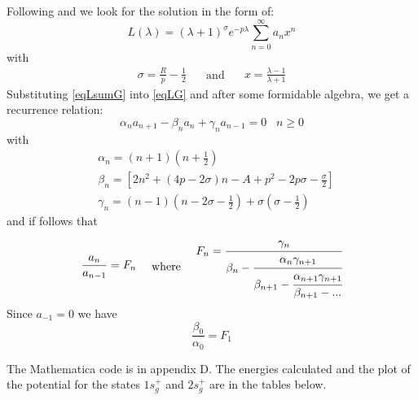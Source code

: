 Following \cite{Bates1} and \cite{H2Plus2d2} we look for the solution in the form of:
\begin{equation}\label{eqLsumG}
L(\lambda) = \left(\lambda +1\right)^\sigma e^{-p\lambda}\sum_{n=0}^{\infty}{a_nx^n}
\end{equation}
with
\begin{equation}
\begin{split}
\sigma = \frac{R}{p} - \frac{1}{2}
\end{split}
\quad\text{ and }\quad
\begin{split}
x = \frac{\lambda-1}{\lambda+1}
\end{split}
\end{equation}
Substituting \eqref{eqLsumG} into \eqref{eqLG} and after some formidable algebra, we get a recurrence relation:
\begin{equation}
\alpha_na_{n+1}-\beta_n a_n+\gamma_na_{n-1} = 0\,\,\,\,\,n \ge 0
\end{equation}
with
\begin{equation}
\begin{split}
& \alpha_n = \left(n + 1\right)\left(n + \frac{1}{2}\right)\\[.8em]
& \beta_n = \left[2n^2 + (4p - 2\sigma)n - A + p^2 - 2p\sigma - \frac{\sigma}{2}\right] \\[.8em]
& \gamma_n = (n-1)\left(n - 2\sigma - \frac{1}{2}\right) + \sigma\left(\sigma - \frac{1}{2}\right)
\end{split}
\end{equation}
and if follows that
\begin{equation}
\begin{split}
\frac{a_n}{a_{n-1}} = F_n
\end{split}
\quad\text{ where }\quad
\begin{split}
F_n = \cfrac{\gamma_n}{\beta_n - \cfrac{\alpha_n \gamma_{n+1}}{\beta_{n+1}-\cfrac{\alpha_{n+1}\gamma_{n+1}}{\beta_{n+1}-\text{...}}}}
\end{split}
\end{equation}
Since $ a_{-1} = 0$ we have
\begin{equation}
\frac{\beta_0}{\alpha_0} = F_1
\end{equation}


The Mathematica code is in appendix D. The energies calculated and the plot of the potential for the states $1s_g^{+}$ and $ 2s_g^{+} $ are in the tables below.

